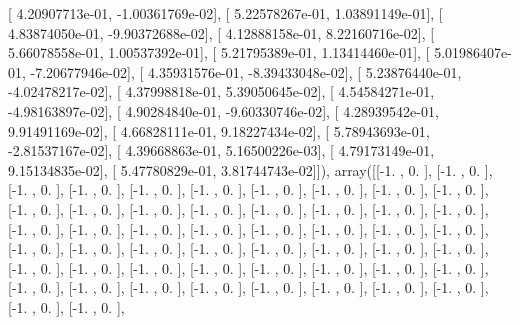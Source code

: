 \documentclass{article}
\begin{document}
       [  4.20907713e-01,  -1.00361769e-02],
       [  5.22578267e-01,   1.03891149e-01],
       [  4.83874050e-01,  -9.90372688e-02],
       [  4.12888158e-01,   8.22160716e-02],
       [  5.66078558e-01,   1.00537392e-01],
       [  5.21795389e-01,   1.13414460e-01],
       [  5.01986407e-01,  -7.20677946e-02],
       [  4.35931576e-01,  -8.39433048e-02],
       [  5.23876440e-01,  -4.02478217e-02],
       [  4.37998818e-01,   5.39050645e-02],
       [  4.54584271e-01,  -4.98163897e-02],
       [  4.90284840e-01,  -9.60330746e-02],
       [  4.28939542e-01,   9.91491169e-02],
       [  4.66828111e-01,   9.18227434e-02],
       [  5.78943693e-01,  -2.81537167e-02],
       [  4.39668863e-01,   5.16500226e-03],
       [  4.79173149e-01,   9.15134835e-02],
       [  5.47780829e-01,   3.81744743e-02]]), array([[-1.        ,  0.        ],
       [-1.        ,  0.        ],
       [-1.        ,  0.        ],
       [-1.        ,  0.        ],
       [-1.        ,  0.        ],
       [-1.        ,  0.        ],
       [-1.        ,  0.        ],
       [-1.        ,  0.        ],
       [-1.        ,  0.        ],
       [-1.        ,  0.        ],
       [-1.        ,  0.        ],
       [-1.        ,  0.        ],
       [-1.        ,  0.        ],
       [-1.        ,  0.        ],
       [-1.        ,  0.        ],
       [-1.        ,  0.        ],
       [-1.        ,  0.        ],
       [-1.        ,  0.        ],
       [-1.        ,  0.        ],
       [-1.        ,  0.        ],
       [-1.        ,  0.        ],
       [-1.        ,  0.        ],
       [-1.        ,  0.        ],
       [-1.        ,  0.        ],
       [-1.        ,  0.        ],
       [-1.        ,  0.        ],
       [-1.        ,  0.        ],
       [-1.        ,  0.        ],
       [-1.        ,  0.        ],
       [-1.        ,  0.        ],
       [-1.        ,  0.        ],
       [-1.        ,  0.        ],
       [-1.        ,  0.        ],
       [-1.        ,  0.        ],
       [-1.        ,  0.        ],
       [-1.        ,  0.        ],
       [-1.        ,  0.        ],
       [-1.        ,  0.        ],
       [-1.        ,  0.        ],
       [-1.        ,  0.        ],
       [-1.        ,  0.        ],
       [-1.        ,  0.        ],
       [-1.        ,  0.        ],
       [-1.        ,  0.        ],
       [-1.        ,  0.        ],
       [-1.        ,  0.        ],
       [-1.        ,  0.        ],
       [-1.        ,  0.        ],
       [-1.        ,  0.        ],
       [-1.        ,  0.        ],
       [-1.        ,  0.        ],
       [-1.        ,  0.        ],
\end{document}
